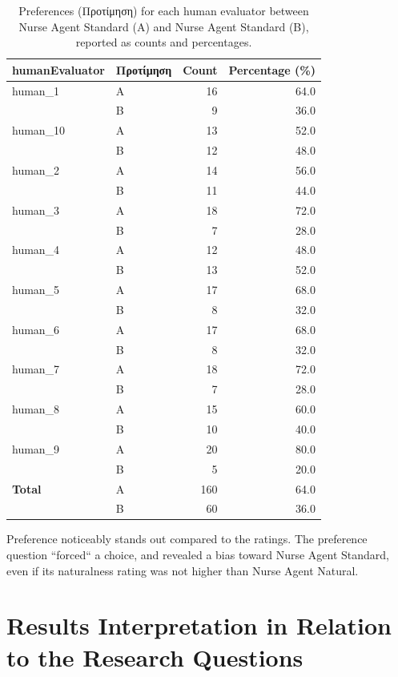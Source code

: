 \begin{table}[H]
\centering
\begin{tabular}{@{}llrr@{}}
\toprule
\textbf{humanEvaluator} & \textbf{Προτίμηση} & \textbf{Count} & \textbf{Percentage (\%)} \\
\hline
human\_1  & A & 16 & 64.0 \\
          & B &  9 & 36.0 \\
human\_10 & A & 13 & 52.0 \\
          & B & 12 & 48.0 \\
human\_2  & A & 14 & 56.0 \\
          & B & 11 & 44.0 \\
human\_3  & A & 18 & 72.0 \\
          & B &  7 & 28.0 \\
human\_4  & A & 12 & 48.0 \\
          & B & 13 & 52.0 \\
human\_5  & A & 17 & 68.0 \\
          & B &  8 & 32.0 \\
human\_6  & A & 17 & 68.0 \\
          & B &  8 & 32.0 \\
human\_7  & A & 18 & 72.0 \\
          & B &  7 & 28.0 \\
human\_8  & A & 15 & 60.0 \\
          & B & 10 & 40.0 \\
human\_9  & A & 20 & 80.0 \\
          & B &  5 & 20.0 \\
\hline
\textbf{Total} & A & 160 & 64.0 \\
               & B &  60 & 36.0 \\
\bottomrule
\end{tabular}
\caption{Preferences (Προτίμηση) for each human evaluator between Nurse Agent Standard (A) and Nurse Agent Standard (B), reported as counts and percentages.}
\label{tab:preferences}
\end{table}
 
Preference noticeably stands out compared to the ratings. The preference question ``forced`` a choice, and revealed a bias toward Nurse Agent Standard, even if its naturalness rating was not higher than Nurse Agent Natural.


\section{Results Interpretation in Relation to the Research Questions}

